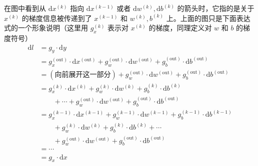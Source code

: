 在图中看到从 $\mathrm{d}x^{(k)}$ 指向 $\mathrm{d}x^{(k-1)}$ 或者 $\mathrm{d}w^{(k)}, \mathrm{d}b^{(k)}$ 的箭头时，它指的是关于 $x^{(k)}$ 的梯度信息被传递到了 $x^{(k-1)}$ 和 $w^{(k)}, b^{(k)}$ 上。上面的图只是下面表达式的一个形象说明（这里用 $g_x^{(k)}$ 表示对 $x^{(k)}$ 的梯度，同理定义对 $w$ 和 $b$ 的梯度符号）
\[
    \begin{aligned}
        \mathrm{d}l & = g_y \cdot \mathrm{d}y                                                                                                                                           \\
                    & = g_x^{(\text{out})} \cdot \mathrm{d}x^{(\text{out})} + g_w^{(\text{out})} \cdot \mathrm{d}w^{(\text{out})} + g_b^{(\text{out})} \cdot \mathrm{d}b^{(\text{out})} \\
                    & = (\text{向前展开这一部分}) + g_w^{(\text{out})} \cdot \mathrm{d}w^{(\text{out})} + g_b^{(\text{out})} \cdot \mathrm{d}b^{(\text{out})}                                   \\
                    & = g_x^{(k)} \cdot \mathrm{d}x^{(k)} + g_w^{(k)} \cdot \mathrm{d}w^{(k)} + g_b^{(k)} \cdot \mathrm{d}b^{(k)}                                                       \\
                    & \qquad+ \cdots + g_w^{(\text{out})} \cdot \mathrm{d}w^{(\text{out})} + g_b^{(\text{out})} \cdot \mathrm{d}b^{(\text{out})}                                        \\
                    & = g_x^{(k-1)} \cdot \mathrm{d}x^{(k-1)} + g_w^{(k-1)} \cdot \mathrm{d}w^{(k-1)} + g_b^{(k-1)} \cdot \mathrm{d}b^{(k-1)}                                           \\
                    & \qquad+ g_w^{(k)} \cdot \mathrm{d}w^{(k)} + g_b^{(k)} \cdot \mathrm{d}b^{(k)} + \cdots                                                                            \\
                    & \qquad + g_w^{(\text{out})} \cdot \mathrm{d}w^{(\text{out})} + g_b^{(\text{out})} \cdot \mathrm{d}b^{(\text{out})}                                                \\
                    & = \cdots                                                                                                                                                          \\
                    & = g_x \cdot \mathrm{d}x                                                                                                                                           \\

\end{aligned}\]
